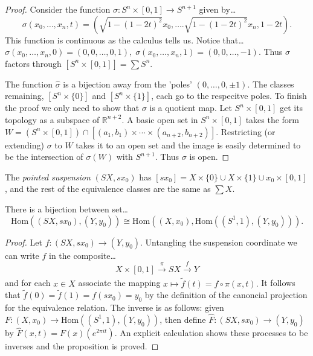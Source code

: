 \begin{proof}
Consider the function $\sigma : S^n \times [0,1] \rightarrow S^{n+1}$ given by\dots
$$\sigma(x_0, \dots, x_n,t) = (\sqrt{1 - (1-2t)^2}x_0, \dots. \sqrt{1 - (1 -2t)^2}x_n, 1 -2t).$$
This function is continuous as the calculus tells us. Notice that\dots
$\sigma(x_0, \dots, x_n, 0) = (0,0,\dots,0,1), \; \sigma(x_0, \dots, x_n, 1) = (0,0,\dots, -1).$
Thus $\sigma$ factors through $[S^n \times [0,1]] = \sum S^n$.
\begin{figure}[H]
\centering

\end{figure}
The function $\hat{\sigma}$ is a bijection away from the 'poles' $(0,\dots,0,\pm 1)$. The classes remaining, $[S^n \times \{ 0 \}]$ and
$[S^n \times \{ 1 \}]$, each go to the respecitve poles. To finish the proof we only need to show that $\sigma$ is a quotient map. Let
$S^n \times [0,1]$ get its topology as a subspace of $\mathbb{R}^{n+2}$. A basic open set in $S^n \times [0,1]$ takes the form
$W = (S^n \times [0,1]) \cap [(a_1, b_1) \times \cdots \times (a_{n+2}, b_{n+2})]$. Restricting (or extending) $\sigma$ to $W$ takes it
to an open set and the image is easily determined to be the intersection of $\sigma(W)$ with $S^{n+1}$. Thus $\sigma$ is open.
\end{proof}

\label{pointedsuspension}
The \emph{pointed suspension} $(SX, sx_0)$ has $[sx_0] = X \times \{ 0 \} \cup X \times \{ 1 \} \cup x_0 \times [0,1]$,
and the rest of the equivalence classes are the same as $\sum X$.

\begin{proposition}
There is a bijection between set\dots
$$\textrm{Hom}((SX,sx_0),(Y,y_0)) \cong \textrm{Hom}((X,x_0),\textrm{Hom}((S^1,1),(Y,y_0))).$$
\end{proposition}

\begin{proof}
Let $f : (SX, sx_0) \rightarrow (Y,y_0)$. Untangling the suspension coordinate we can write $f$ in the composite\dots
$$X \times [0,1] \xrightarrow[]{\pi} SX \xrightarrow[]{f} Y$$
and for each $x \in X$ associate the mapping $x \mapsto \tilde f (t) = f \circ \pi (x,t).$ It follows that $\tilde f (0) = \tilde f (1) = f(sx_0) = y_0$
by the definition of the canoncial projection for the equivalence relation. The inverse is as follows: given $F : (X,x_0) \rightarrow \textrm{Hom}((S^1,1),(Y,y_0))$,
then define $\hat{F} : (SX, sx_0) \rightarrow (Y, y_0)$ by $\hat{F}(x,t) = F(x)(e^{2 \pi i t})$. An explicit calculation shows these processes to be inverses and the
proposition is proved.
\end{proof}

